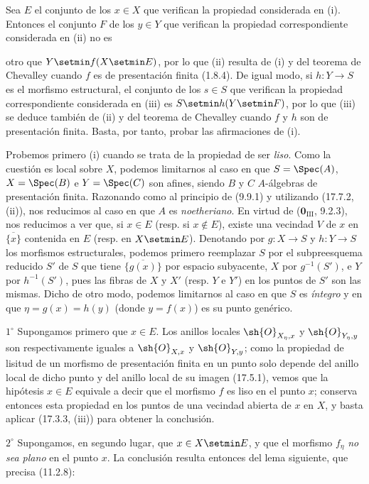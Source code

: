 Sea $E$ el conjunto de los $x\in X$ que verifican la propiedad considerada en (i). Entonces el conjunto $F$ de los $y\in Y$ que verifican la propiedad correspondiente considerada en (ii) no es


otro que $Y\setmin f(X\setmin E)$, por lo que (ii) resulta de (i) y del teorema de Chevalley cuando $f$ es de presentación finita (1.8.4). De igual modo, si $h:Y\to S$ es el morfismo estructural, el conjunto de los $s\in S$ que verifican la propiedad correspondiente considerada en (iii) es $S\setmin h(Y\setmin F)$, por lo que (iii) se deduce también de (ii) y del teorema de Chevalley cuando $f$ y $h$ son de presentación finita. Basta, por tanto, probar las afirmaciones de (i).

Probemos primero (i) cuando se trata de la propiedad de ser \emph{liso}. Como la cuestión es local sobre $X$, podemos limitarnos al caso en que $S=\Spec(A)$, $X=\Spec(B)$ e $Y=\Spec(C)$ son afines, siendo $B$ y $C$ $A$-álgebras de presentación finita. Razonando como al principio de (9.9.1) y utilizando (17.7.2, (ii)), nos reducimos al caso en que $A$ es \emph{noetheriano}. En virtud de ($\mathbf{0}_{\mathrm{III}}$, 9.2.3), nos reducimos a ver que, si $x\in E$ (resp. si $x\notin E$), existe una vecindad $V$ de $x$ en $\overline{\{x\}}$ contenida en $E$ (resp. en $X\setmin E$). Denotando por $g:X\to S$ y $h:Y\to S$ los morfismos estructurales, podemos primero reemplazar $S$ por el subpreesquema reducido $S'$ de $S$ que tiene $\overline{\{g(x)\}}$ por espacio subyacente, $X$ por $g^{-1}(S')$, e $Y$ por $h^{-1}(S')$, pues las fibras de $X$ y $X'$ (resp. $Y$ e $Y'$) en los puntos de $S'$ son las mismas. Dicho de otro modo, podemos limitarnos al caso en que $S$ es \emph{íntegro} y en que $\eta=g(x)=h(y)$ (donde $y=f(x)$) es su punto genérico.

$1^\circ$ Supongamos primero que $x\in E$. Los anillos locales $\sh{O}_{X_\eta,x}$ y $\sh{O}_{Y_\eta,y}$ son respectivamente iguales a $\sh{O}_{X,x}$ y $\sh{O}_{Y,y}$; como la propiedad de lisitud de un morfismo de presentación finita en un punto solo depende del anillo local de dicho punto y del anillo local de su imagen (17.5.1), vemos que la hipótesis $x\in E$ equivale a decir que el morfismo $f$ es liso en el punto $x$; conserva entonces esta propiedad en los puntos de una vecindad abierta de $x$ en $X$, y basta aplicar (17.3.3, (iii)) para obtener la conclusión.

$2^\circ$ Supongamos, en segundo lugar, que $x\in X\setmin E$, y que el morfismo $f_\eta$ \emph{no sea plano} en el punto $x$. La conclusión resulta entonces del lema siguiente, que precisa (11.2.8):

